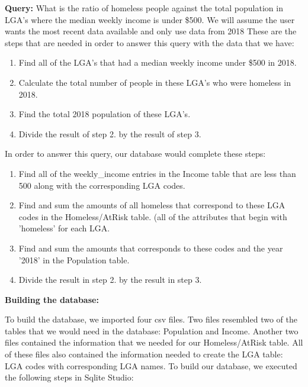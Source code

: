 \documentclass[12pt, a4paper]{article}
\begin{document}
\textbf{Query:} What is the ratio of homeless people against the total population in LGA's where the median weekly income is under \$500. We will assume the user wants the most recent data available and only use data from 2018
These are the steps that are needed in order to answer this query with the data that we have:
\begin{enumerate}
\item Find all of the LGA's that had a median weekly income under \$500 in 2018.
\item Calculate the total number of people in these LGA's who were homeless in 2018.
\item Find the total 2018 population of these LGA's.
\item Divide the result of step 2. by the result of step 3.
\end{enumerate}
In order to answer this query, our database would complete these steps:
\begin{enumerate}
\item Find all of the weekly\_income entries in the Income table that are less than 500 along with the corresponding LGA codes.
\item Find and sum the amounts of all homeless that correspond to these LGA codes in the Homeless/AtRisk table. (all of the attributes that begin with 'homeless' for each LGA.
\item Find and sum the amounts that corresponds to these codes and the year '2018' in the Population table.
\item Divide the result in step 2. by the result in step 3.
\end{enumerate} 

\textbf{Building the database:} 

To build the database, we imported four csv files. Two files resembled two of the tables that we would need in the database: Population and Income. Another two files contained the information that we needed for our Homeless/AtRisk table. All of these files also contained the information needed to create the LGA table: LGA codes with corresponding LGA names. To build our database, we executed the following steps in Sqlite Studio:
\end{document}
